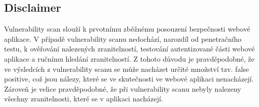 \subsection{Disclaimer}
Vulnerability scan slouží k prvotnímu zběžnému posouzení bezpečnosti webové aplikace. V případě vulnerability scanu nedochází, narozdíl od penetračního testu, k ověřování nalezených zranitelností, testování autentizované části webové aplikace a ručnímu hledání zranitelností. Z tohoto důvodu je pravděpodobné, že ve výsledcích z vulnerability scanu se může nacházet určité množství tzv. false positive, což jsou nálezy, které se ve skutečnosti ve webové aplikaci nenacházejí. Zároveň je velice pravděpodobné, že při vulnerability scanu nebyly nalezeny všechny zranitelnosti, které se v aplikaci nacházejí.

